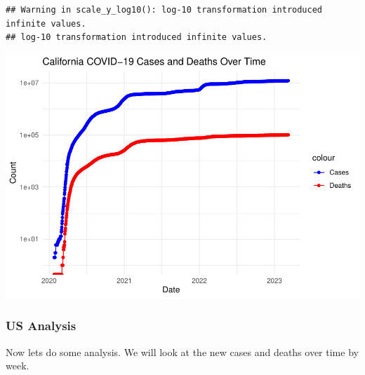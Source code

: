 \documentclass[
]{article}
\begin{document}
\begin{verbatim}
## Warning in scale_y_log10(): log-10 transformation introduced infinite values.
## log-10 transformation introduced infinite values.
\end{verbatim}

\includegraphics{covid-data-analysis_files/figure-latex/us-visualizations-2.pdf}

\subsubsection{US Analysis}\label{us-analysis}

Now lets do some analysis. We will look at the new cases and deaths over
time by week.
\end{document}
